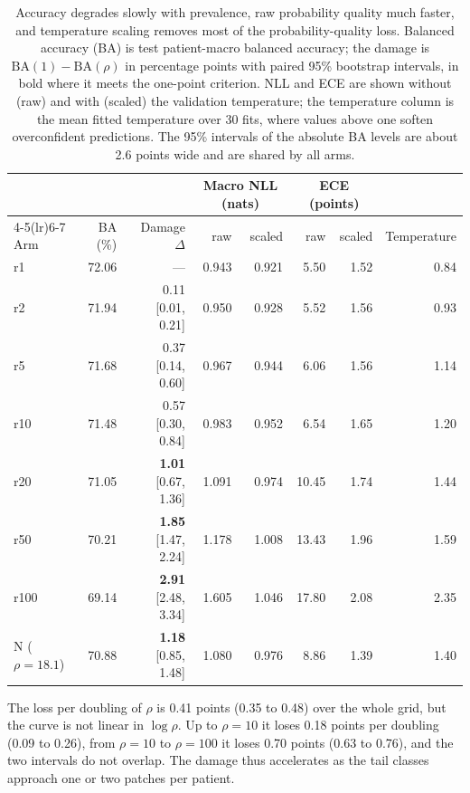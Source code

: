\begin{table}[htbp]
\centering
\small
\setlength{\tabcolsep}{4pt}
\renewcommand{\arraystretch}{1.15}
\begin{tabular}{@{}lrrrrrrr@{}}
\toprule
 & & & \multicolumn{2}{c}{Macro NLL (nats)} & \multicolumn{2}{c}{ECE (points)} & \\
\cmidrule(lr){4-5}\cmidrule(lr){6-7}
Arm & BA (\%) & Damage $\Delta$ & raw & scaled & raw & scaled & Temperature \\
\midrule
r1 & 72.06 & --- & 0.943 & 0.921 & 5.50 & 1.52 & 0.84 \\
r2 & 71.94 & 0.11 [0.01, 0.21] & 0.950 & 0.928 & 5.52 & 1.56 & 0.93 \\
r5 & 71.68 & 0.37 [0.14, 0.60] & 0.967 & 0.944 & 6.06 & 1.56 & 1.14 \\
r10 & 71.48 & 0.57 [0.30, 0.84] & 0.983 & 0.952 & 6.54 & 1.65 & 1.20 \\
r20 & 71.05 & \textbf{1.01} [0.67, 1.36] & 1.091 & 0.974 & 10.45 & 1.74 & 1.44 \\
r50 & 70.21 & \textbf{1.85} [1.47, 2.24] & 1.178 & 1.008 & 13.43 & 1.96 & 1.59 \\
r100 & 69.14 & \textbf{2.91} [2.48, 3.34] & 1.605 & 1.046 & 17.80 & 2.08 & 2.35 \\
\addlinespace
N ($\rho=18.1$) & 70.88 & \textbf{1.18} [0.85, 1.48] & 1.080 & 0.976 & 8.86 & 1.39 & 1.40 \\
\bottomrule
\end{tabular}
\caption{Accuracy degrades slowly with prevalence, raw probability quality much faster, and temperature scaling removes most of the probability-quality loss. Balanced accuracy (BA) is test patient-macro balanced accuracy; the damage is $\mathrm{BA}(1)-\mathrm{BA}(\rho)$ in percentage points with paired 95\% bootstrap intervals, in bold where it meets the one-point criterion. NLL and ECE are shown without (raw) and with (scaled) the validation temperature; the temperature column is the mean fitted temperature over 30 fits, where values above one soften overconfident predictions. The 95\% intervals of the absolute BA levels are about 2.6 points wide and are shared by all arms.}
\label{tab:curve}
\end{table}

\noindent The loss per doubling of $\rho$ is 0.41 points (0.35 to 0.48) over the whole grid, but the curve is not linear in $\log\rho$. Up to $\rho=10$ it loses 0.18 points per doubling (0.09 to 0.26), from $\rho=10$ to $\rho=100$ it loses 0.70 points (0.63 to 0.76), and the two intervals do not overlap. The damage thus accelerates as the tail classes approach one or two patches per patient.

